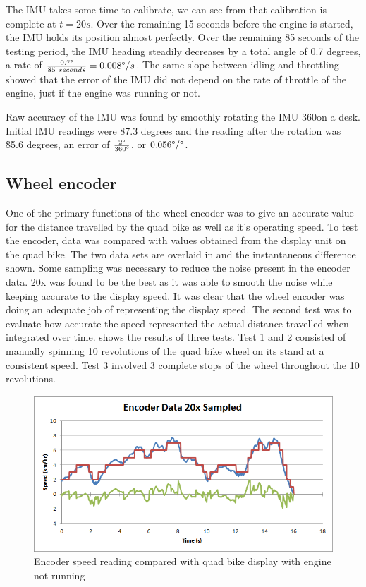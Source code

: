 \documentclass[main.tex]{subfiles}
\begin{document}
The IMU takes some time to calibrate, we can see from  that calibration is complete at $t=20s$. Over the remaining 15 seconds before the engine is started, the IMU holds its position almost perfectly. Over the remaining 85 seconds of the testing period, the IMU heading steadily decreases by a total angle of 0.7 degrees, a rate of $\frac{0.7\degree}{85\ seconds} = 0.008 \degree/s$. The same slope between idling and throttling showed that the error of the IMU did not depend on the rate of throttle of the engine, just if the engine was running or not.

Raw accuracy of the IMU was found by smoothly rotating the IMU 360\degree on a desk. Initial IMU readings were 87.3 degrees and the reading after the rotation was \~85.6 degrees, an error of $\frac{2\degree}{360\degree}$, or $0.056\degree/\degree$.

\subsection{Wheel encoder}
One of the primary functions of the wheel encoder was to give an accurate value for the distance travelled by the quad bike as well as it's operating speed. To test the encoder, data was compared with values obtained from the display unit on the quad bike. The two data sets are overlaid in  and the instantaneous difference shown. Some sampling was necessary to reduce the noise present in the encoder data. 20x was found to be the best as it was able to smooth the noise while keeping accurate to the display speed. It was clear that the wheel encoder was doing an adequate job of representing the display speed. The second test was to evaluate how accurate the speed represented the actual distance travelled when integrated over time.  shows the results of three tests. Test 1 and 2 consisted of manually spinning 10 revolutions of the quad bike wheel on its stand at a consistent speed. Test 3 involved 3 complete stops of the wheel throughout the 10 revolutions.

\begin{figure}[ht]
\includegraphics[width=1\textwidth]{5-Testing/encoder_data_20x_sampled.png}
\centering
\caption[Encoder speed reading compared with quad bike display]{Encoder speed reading compared with quad bike display with engine not running}
\end{figure}
\end{document}
